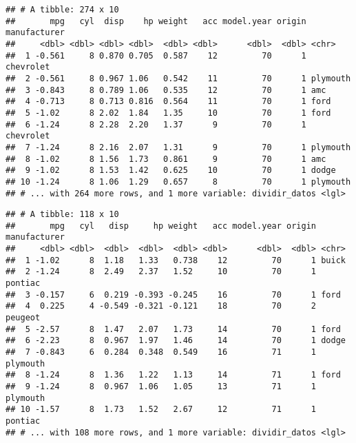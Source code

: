 \documentclass[]{article}
\newenvironment{Shaded}{\begin{snugshade}}{\end{snugshade}}
\newcommand{\KeywordTok}[1]{\textcolor[rgb]{0.13,0.29,0.53}{\textbf{{#1}}}}
\newcommand{\DecValTok}[1]{\textcolor[rgb]{0.00,0.00,0.81}{{#1}}}
\newcommand{\OtherTok}[1]{\textcolor[rgb]{0.56,0.35,0.01}{{#1}}}
\newcommand{\NormalTok}[1]{{#1}}
\begin{document}
\begin{Shaded}
\end{Shaded}

\begin{verbatim}
## # A tibble: 274 x 10
##       mpg   cyl  disp    hp weight   acc model.year origin manufacturer
##     <dbl> <dbl> <dbl> <dbl>  <dbl> <dbl>      <dbl>  <dbl> <chr>       
##  1 -0.561     8 0.870 0.705  0.587    12         70      1 chevrolet   
##  2 -0.561     8 0.967 1.06   0.542    11         70      1 plymouth    
##  3 -0.843     8 0.789 1.06   0.535    12         70      1 amc         
##  4 -0.713     8 0.713 0.816  0.564    11         70      1 ford        
##  5 -1.02      8 2.02  1.84   1.35     10         70      1 ford        
##  6 -1.24      8 2.28  2.20   1.37      9         70      1 chevrolet   
##  7 -1.24      8 2.16  2.07   1.31      9         70      1 plymouth    
##  8 -1.02      8 1.56  1.73   0.861     9         70      1 amc         
##  9 -1.02      8 1.53  1.42   0.625    10         70      1 dodge       
## 10 -1.24      8 1.06  1.29   0.657     8         70      1 plymouth    
## # ... with 264 more rows, and 1 more variable: dividir_datos <lgl>
\end{verbatim}

\begin{Shaded}
\end{Shaded}

\begin{verbatim}
## # A tibble: 118 x 10
##       mpg   cyl   disp     hp weight   acc model.year origin manufacturer
##     <dbl> <dbl>  <dbl>  <dbl>  <dbl> <dbl>      <dbl>  <dbl> <chr>       
##  1 -1.02      8  1.18   1.33   0.738    12         70      1 buick       
##  2 -1.24      8  2.49   2.37   1.52     10         70      1 pontiac     
##  3 -0.157     6  0.219 -0.393 -0.245    16         70      1 ford        
##  4  0.225     4 -0.549 -0.321 -0.121    18         70      2 peugeot     
##  5 -2.57      8  1.47   2.07   1.73     14         70      1 ford        
##  6 -2.23      8  0.967  1.97   1.46     14         70      1 dodge       
##  7 -0.843     6  0.284  0.348  0.549    16         71      1 plymouth    
##  8 -1.24      8  1.36   1.22   1.13     14         71      1 ford        
##  9 -1.24      8  0.967  1.06   1.05     13         71      1 plymouth    
## 10 -1.57      8  1.73   1.52   2.67     12         71      1 pontiac     
## # ... with 108 more rows, and 1 more variable: dividir_datos <lgl>
\end{verbatim}
\end{document}
